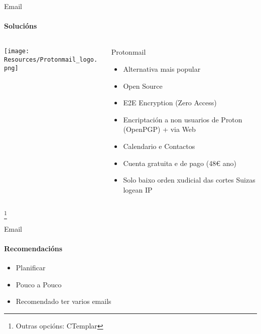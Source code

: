 \documentclass{beamer}
\begin{document}


\begin{frame}{Email}
  \framesubtitle{Solucións}

  \begin{columns}
    \begin{column}{0.5\textwidth}
      \texttt{[image: Resources/Protonmail\_logo.png]}

      \vspace{1cm}


    \end{column}

    \begin{column}{0.5\textwidth}
      \begin{block}{Protonmail}
        \begin{itemize}
          \item Alternativa mais popular
          \item Open Source
          \item E2E Encryption (Zero Access)
          \item Encriptación a non usuarios de Proton (OpenPGP) + via Web
          \item Calendario e Contactos
          \item Cuenta gratuita e de pago (48€ ano)
          \item Solo baixo orden xudicial das cortes Suizas logean IP
        \end{itemize}
      \end{block}

    \end{column}

  \end{columns}

  \footnote{Outras opcións: CTemplar}

\end{frame}


\begin{frame}{Email}
  \framesubtitle{Recomendacións}
  \begin{itemize}
    \item Planificar
    \item Pouco a Pouco
    \item Recomendado ter varios emails
  \end{itemize}
\end{frame}
\end{document}

